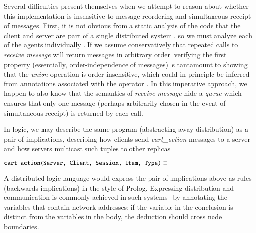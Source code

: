 Several difficulties present themselves when we attempt to reason about whether
this implementation is insensitive to message reordering and simultaneous receipt of messages. 
First, it is not obvious from a static analysis of the code that the client and server are
part of a single distributed system , so we must analyze each of the agents individually .
If we assume conservatively that repeated calls to {\em receive message} will return messages in
arbitrary order, verifying the first property (essentially, order-independence of messages)
is tantamount to showing that the {\em union} operation is
order-insensitive, which could in principle be inferred from annotations associated
with the operator .
In this imperative approach, we happen to also know that the semantics of {\em receive message}
hide a {\em queue} which ensures that only one message (perhaps arbitrarily chosen in the
event of simultaneous receipt) is returned by each call.


In logic, we may describe the same program (abstracting away distribution)
as a pair of implications, describing how clients send {\em cart\_action}
messages to a server and how servers multicast such tuples to other replicas:


$\dedalus{cart\_action(Server, Client, Session, Item, Type)} \equiv $

A distributed logic language would express the pair of implications above as rules
(backwards implications) in the style of Prolog.  Expressing distribution and communication
is commonly achieved in such systems~\cite{loo-sigmod06} by annotating the variables that 
contain network addresses: if the variable in the conclusion is distinct from the variables in
the body, the deduction should cross node boundaries.

